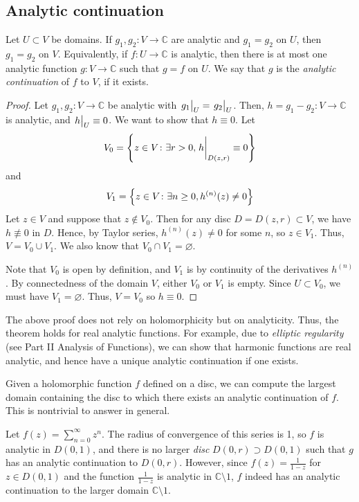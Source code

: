 \subsection{Analytic continuation}
\begin{theorem}
	Let \( U \subset V \) be domains.
	If \( g_1, g_2 \colon V \to \mathbb C \) are analytic and \( g_1 = g_2 \) on \( U \), then \( g_1 = g_2 \) on \( V \).
	Equivalently, if \( f \colon U \to \mathbb C \) is analytic, then there is at most one analytic function \( g \colon V \to \mathbb C \) such that \( g = f \) on \( U \).
	We say that \( g \) is the \textit{analytic continuation} of \( f \) to \( V \), if it exists.
\end{theorem}
\begin{proof}
	Let \( g_1, g_2 \colon V \to \mathbb C \) be analytic with \( \eval{g_1}_U = \eval{g_2}_U \).
	Then, \( h = g_1 - g_2 \colon V \to \mathbb C \) is analytic, and \( \eval{h}_U \equiv 0 \).
	We want to show that \( h \equiv 0 \).
	Let
	\[
		V_0 = \qty{z \in V \colon \exists r > 0, \eval{h}_{D(z,r)} \equiv 0}
	\]
	and
	\[
		V_1 = \qty{z \in V \colon \exists n \geq 0, h^{(n)}(z) \neq 0}
	\]
	Let \( z \in V \) and suppose that \( z \not\in V_0 \).
	Then for any disc \( D = D(z,r) \subset V \), we have \( h \not\equiv 0 \) in \( D \).
	Hence, by Taylor series, \( h^{(n)}(z) \neq 0 \) for some \( n \), so \( z \in V_1 \).
	Thus, \( V = V_0 \cup V_1 \).
	We also know that \( V_0 \cap V_1 = \varnothing \).

	Note that \( V_0 \) is open by definition, and \( V_1 \) is by continuity of the derivatives \( h^{(n)} \).
	By connectedness of the domain \( V \), either \( V_0 \) or \( V_1 \) is empty.
	Since \( U \subset V_0 \), we must have \( V_1 = \varnothing \).
	Thus, \( V = V_0 \) so \( h \equiv 0 \).
\end{proof}
\begin{remark}
	The above proof does not rely on holomorphicity but on analyticity.
	Thus, the theorem holds for real analytic functions.
	For example, due to \textit{elliptic regularity} (see Part II Analysis of Functions), we can show that harmonic functions are real analytic, and hence have a unique analytic continuation if one exists.
\end{remark}
Given a holomorphic function \( f \) defined on a disc, we can compute the largest domain containing the disc to which there exists an analytic continuation of \( f \).
This is nontrivial to answer in general.
\begin{example}
	Let \( f(z) = \sum_{n=0}^\infty z^n \).
	The radius of convergence of this series is 1, so \( f \) is analytic in \( D(0,1) \), and there is no larger \textit{disc} \( D(0,r) \supset D(0,1) \) such that \( g \) has an analytic continuation to \( D(0,r) \).
	However, since \( f(z) = \frac{1}{1-z} \) for \( z \in D(0,1) \) and the function \( \frac{1}{1-z} \) is analytic in \( \mathbb C \setminus \qty{1} \), \( f \) indeed has an analytic continuation to the larger domain \( \mathbb C \setminus \qty{1} \).
\end{example}
